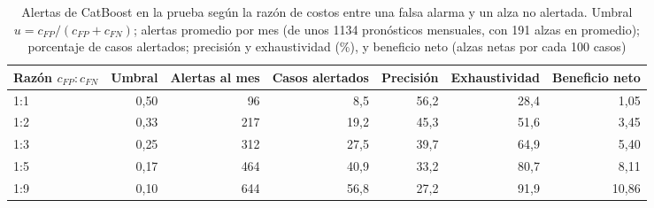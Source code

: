 \begin{table}[htbp]\centering\small
\caption{Alertas de CatBoost en la prueba según la razón de costos entre una falsa alarma y un alza no alertada. Umbral $u=c_{FP}/(c_{FP}+c_{FN})$; alertas promedio por mes (de unos 1134 pronósticos mensuales, con 191 alzas en promedio); porcentaje de casos alertados; precisión y exhaustividad (\%), y beneficio neto (alzas netas por cada 100 casos)}\label{tab:alertas}
\begin{adjustbox}{max width=\textwidth}\begin{tabular}{lrrrrrr}\toprule
Razón $c_{FP}:c_{FN}$ & Umbral & Alertas al mes & Casos alertados & Precisión & Exhaustividad & Beneficio neto\\ \midrule
1:1 & 0{,}50 & 96 & 8{,}5 & 56{,}2 & 28{,}4 & 1{,}05 \\
1:2 & 0{,}33 & 217 & 19{,}2 & 45{,}3 & 51{,}6 & 3{,}45 \\
1:3 & 0{,}25 & 312 & 27{,}5 & 39{,}7 & 64{,}9 & 5{,}40 \\
1:5 & 0{,}17 & 464 & 40{,}9 & 33{,}2 & 80{,}7 & 8{,}11 \\
1:9 & 0{,}10 & 644 & 56{,}8 & 27{,}2 & 91{,}9 & 10{,}86 \\
\bottomrule\end{tabular}\end{adjustbox}\end{table}
